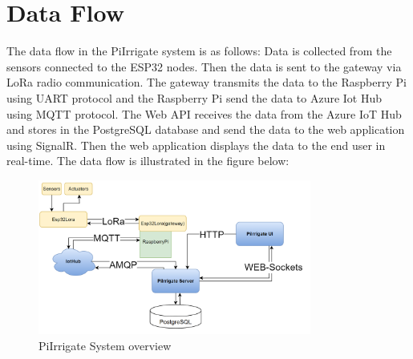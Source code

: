 \section{Data Flow}
The data flow in the PiIrrigate system is as follows:
Data is collected from the sensors connected to the ESP32 nodes. Then the data is sent to the gateway via LoRa radio communication.
The gateway transmits the data to the Raspberry Pi using UART protocol and the Raspberry Pi send the data to Azure Iot Hub
using MQTT protocol. The Web API receives the data from the Azure IoT Hub and stores in the PostgreSQL database and
send the data to the web application using SignalR. Then the web application displays the data to the end user 
in real-time.
The data flow is illustrated in the figure below:
\begin{figure}[H]
    \centering
    \includegraphics[width=0.8\textwidth]{images/data-flow.png}
    \caption{PiIrrigate System overview}
    \label{fig:system-overview}
\end{figure}

